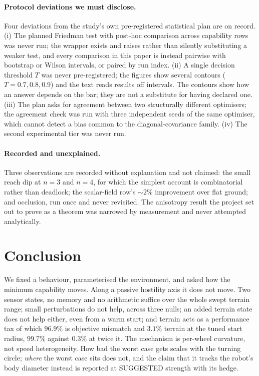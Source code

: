 \documentclass[11pt,a4paper]{article}
\begin{document}
\paragraph{Protocol deviations we must disclose.}
Four deviations from the study's own pre-registered statistical plan are on
record. (i) The planned Friedman test with post-hoc comparison across capability
rows was never run; the wrapper exists and raises rather than silently
substituting a weaker test, and every comparison in this paper is instead
pairwise with bootstrap or Wilson intervals, or paired by run index.
(ii) A single decision threshold $T$ was never pre-registered; the figures show
several contours ($T = 0.7, 0.8, 0.9$) and the text reads results off intervals.
The contours show how an answer depends on the bar; they are not a substitute
for having declared one. (iii) The plan asks for agreement between two
structurally different optimisers; the agreement check was run with three
independent seeds of the same optimiser, which cannot detect a bias common to
the diagonal-covariance family. (iv) The second experimental tier was never run.

\paragraph{Recorded and unexplained.}
Three observations are recorded without explanation and not claimed: the small
reach dip at $n = 3$ and $n = 4$, for which the simplest account is combinatorial
rather than deadlock; the scalar-field row's $\sim\!2\%$ improvement over flat
ground; and occlusion, run once and never revisited. The anisotropy result the
project set out to prove as a theorem was narrowed by measurement and never
attempted analytically.

\section{Conclusion}
\label{sec:conclusion}

We fixed a behaviour, parameterised the environment, and asked how the minimum
capability moves. Along a passive hostility axis it does not move. Two sensor
states, no memory and no arithmetic suffice over the whole swept terrain range;
small perturbations do not help, across three nulls; an added terrain state does
not help either, even from a warm start; and terrain acts as a performance tax of
which $96.9\%$ is objective mismatch and $3.1\%$ terrain at the tuned start
radius, $99.7\%$ against $0.3\%$ at twice it. The mechanism is per-wheel
curvature, not speed heterogeneity. How bad the worst case gets scales with the
turning circle; \emph{where} the worst case sits does not, and the claim that it
tracks the robot's body diameter instead is reported at SUGGESTED strength with
its hedge.
\end{document}
